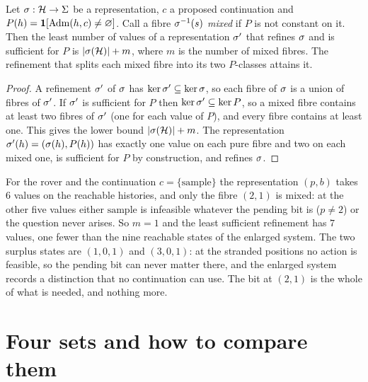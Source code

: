 \begin{newresult}\label{prop:min-refine}
Let $\sigma:\mathcal{H}\to\Sigma$ be a representation, $c$ a proposed continuation and $P(h)=\mathbf{1}[\operatorname{Adm}(h,c)\neq\varnothing]$. Call a fibre $\sigma^{-1}(s)$ \emph{mixed} if $P$ is not constant on it. Then the least number of values of a representation $\sigma'$ that refines $\sigma$ and is sufficient for $P$ is $|\sigma(\mathcal{H})|+m$, where $m$ is the number of mixed fibres. The refinement that splits each mixed fibre into its two $P$-classes attains it.
\end{newresult}
\begin{proof}
A refinement $\sigma'$ of $\sigma$ has $\ker\sigma'\subseteq\ker\sigma$, so each fibre of $\sigma$ is a union of fibres of $\sigma'$. If $\sigma'$ is sufficient for $P$ then $\ker\sigma'\subseteq\ker P$, so a mixed fibre contains at least two fibres of $\sigma'$ (one for each value of $P$), and every fibre contains at least one. This gives the lower bound $|\sigma(\mathcal{H})|+m$. The representation $\sigma'(h)=(\sigma(h),P(h))$ has exactly one value on each pure fibre and two on each mixed one, is sufficient for $P$ by construction, and refines $\sigma$.
\end{proof}

For the rover and the continuation $c=\{\mathrm{sample}\}$ the representation $(p,b)$ takes $6$ values on the reachable histories, and only the fibre $(2,1)$ is mixed: at the other five values either $\mathrm{sample}$ is infeasible whatever the pending bit is ($p\ne2$) or the question never arises. So $m=1$ and the least sufficient refinement has $7$ values, one fewer than the nine reachable states of the enlarged system. The two surplus states are $(1,0,1)$ and $(3,0,1)$: at the stranded positions no action is feasible, so the pending bit can never matter there, and the enlarged system records a distinction that no continuation can use. The bit at $(2,1)$ is the whole of what is needed, and nothing more.

\section{Four sets and how to compare them}\label{sec:four-sets}

